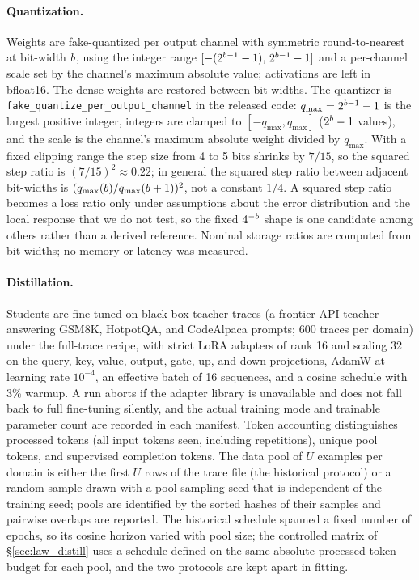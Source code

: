 \paragraph{Quantization.} Weights are fake-quantized per output channel
with symmetric round-to-nearest at bit-width $b$, using the integer
range $[-(2^{b-1}-1),\,2^{b-1}-1]$ and a per-channel scale set
by the channel's maximum absolute value; activations are left in
bfloat16. The dense weights are restored between bit-widths. The quantizer is
\texttt{fake\_quantize\_per\_output\_channel} in the released code:
$q_{\max}=2^{b-1}-1$ is the largest positive integer, integers are
clamped to $[-q_{\max},q_{\max}]$ ($2^{b}-1$ values), and the
scale is the channel's maximum absolute weight divided by $q_{\max}$.
With a fixed clipping range the step size from 4 to 5 bits shrinks by
$7/15$, so the squared step ratio is $(7/15)^2\approx0.22$; in general
the squared step ratio between adjacent bit-widths is
$(q_{\max}(b)/q_{\max}(b+1))^2$, not a constant $1/4$. A
squared step ratio becomes a loss ratio only under assumptions about
the error distribution and the local response that we do not test, so
the fixed $4^{-b}$ shape is one candidate among others rather than a
derived reference. Nominal storage ratios are computed from bit-widths;
no memory or latency was measured.

\paragraph{Distillation.} Students are fine-tuned on black-box teacher
traces (a frontier API teacher answering GSM8K, HotpotQA, and CodeAlpaca
prompts; 600 traces per domain) under the full-trace recipe, with
strict LoRA adapters of rank 16 and scaling 32 on the query, key, value,
output, gate, up, and down projections, AdamW at learning rate
$10^{-4}$, an effective batch of 16 sequences, and a cosine schedule
with 3\% warmup. A run aborts if the adapter library is unavailable and does not fall
back to full fine-tuning silently, and the actual
training mode and trainable parameter count are recorded in each
manifest. Token accounting distinguishes processed tokens (all input
tokens seen, including repetitions), unique pool tokens, and supervised
completion tokens. The data pool of $U$ examples per domain is either
the first $U$ rows of the trace file (the historical protocol) or a
random sample drawn with a pool-sampling seed that is independent of the
training seed; pools are identified by the sorted hashes of their
samples and pairwise overlaps are reported. The historical schedule
spanned a fixed number of epochs, so its cosine horizon varied with
pool size; the controlled matrix of \S\ref{sec:law_distill} uses a schedule
defined on the same absolute processed-token budget for each pool, and
the two protocols are kept apart in fitting.




